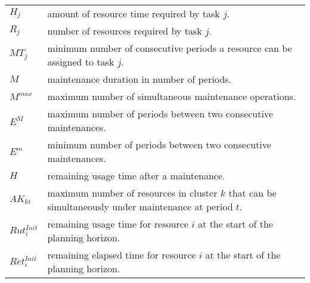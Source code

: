 \documentclass[a4paper,onecolumn,fleqn]{article}
\begin{document}
    \begin{tabular}{p{8mm}p{167mm}}
        $H_j$             & amount of resource time required by task $j$. \\
        $R_j$             & number of resources required by task $j$. \\
        $MT_j$            & minimum number of consecutive periods a resource can be assigned to task $j$. \\
        $M$               & maintenance duration in number of periods. \\
        $M^{max}$         & maximum number of simultaneous maintenance operations. \\
        $E^{M}$         & maximum number of periods between two consecutive maintenances. \\
        $E^{m}$         & minimum number of periods between two consecutive maintenances. \\
        $H$               & remaining usage time after a maintenance. \\
        $AK_{kt}$         & maximum number of resources in cluster $k$ that can be simultaneously under maintenance at period $t$.\\
        $Rut^{Init}_{i}$  & remaining usage time for resource $i$ at the start of the planning horizon. \\
        $Ret^{Init}_{i}$  & remaining elapsed time for resource $i$ at the start of the planning horizon. \\
    \end{tabular}
\end{document}
